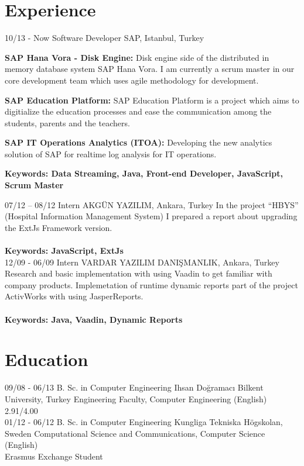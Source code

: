 \documentclass[]{friggeri-cv}
\begin{document}
\section{Experience}
\begin{entrylist}
  \entry
    {10/13 - Now}
    {Software Developer}
    {SAP, Istanbul, Turkey}
    {
     \textbf{SAP Hana Vora - Disk Engine:} Disk engine side of the distributed in memory database system SAP Hana Vora. I am currently a scrum master in our core development team which uses agile methodology for development.
    \item \textbf{SAP Education Platform:} SAP Education Platform is a project which aims to digitialize the education processes and ease the communication among the students, parents and the teachers.
    \item \textbf{SAP IT Operations Analytics (ITOA):} Developing the new analytics solution of SAP for realtime log analysis for IT operations.\\
    \item \textbf{Keywords: Data Streaming, Java, Front-end Developer, JavaScript, Scrum Master\\}
    }
  \entry
    {07/12 – 08/12 }
    {Intern}
    {AKGÜN YAZILIM, Ankara, Turkey}
    {In the project “HBYS” (Hospital Information Management System) I prepared a report about upgrading the ExtJs Framework version.\\\\
    \textbf{Keywords: JavaScript, ExtJs\\}}
    \entry
    {12/09 - 06/09}
    {Intern}
    {VARDAR YAZILIM DANIŞMANLIK, Ankara, Turkey}
    {Research and basic implementation with using Vaadin to get familiar with company products. Implemetation of runtime dynamic reports part of the project ActivWorks with using JasperReports.\\\\
    \textbf{Keywords: Java, Vaadin, Dynamic Reports\\}
    }
\end{entrylist}

\section{Education}
\begin{entrylist}
  \entry
    {09/08 - 06/13}
    {B. Sc. in Computer Engineering}
    {Ihsan Doğramacı Bilkent University, Turkey}
    {Engineering Faculty, Computer Engineering (English)\\
    2.91/4.00 \\}
    \entry
    {01/12 - 06/12}
    {B. Sc. in Computer Engineering}
    {Kungliga Tekniska Högskolan, Sweden }
    {Computational Science and Communications, Computer Science (English)\\
    Erasmus Exchange Student \\}

\end{entrylist}
\end{document}
